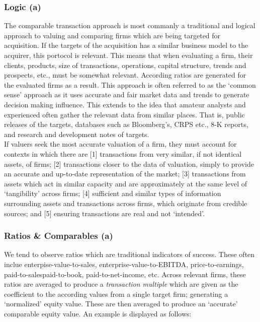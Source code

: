 \documentclass[11pt, english]{article}
\begin{document}
		\subsubsection*{Logic (a)}

	The comparable transaction approach is most commanly a traditional and logical approach to valuing and comparing firms which are being targeted for acquisition. If the targets of the acquisition has a similar business model to the acquirer, this portocol is relevant. This means that when evaluating a firm, their clients, products, size of transactions, operations, capital structure, trends and prospects, etc., must be somewhat relevant. According ratios are generated for the evaluated firms as a result. This approach is often referred to as the `common sense' approach as it uses accurate and fair market data and trends to generate decision making influence. This extends to the idea that amateur analysts and experienced often gather the relevant data from similar places. That is, public releases of the targets, databases such as Bloomberg's, CRPS etc., 8-K reports, and research and development notes of targets.\\

	If valuers seek the most accurate valuation of a firm, they must account for contexts in which there are [1] transactions from very similar, if not identical assets, of firms; [2] transactions closer to the data of valuation, simply to provide an accurate and up-to-date representation of the market; [3] transactions from assets which act in similar capacity and are approximately at the same level of `tangibility' across firms; [4] sufficient and similar types of information surrounding assets and transactions across firms, which originate from credible sources; and [5] ensuring transactions are real and not `intended'.

		\subsubsection*{Ratios \& Comparables (a)}
	
	We tend to observe ratios which are traditional indicators of success. These often inclue enterpise-value-to-sales, enterprise-value-to-EBITDA, price-to-earnings, paid-to-salespaid-to-book, paid-to-net-income, etc. Across relevant firms, these ratios are averaged to produce a \textit{transaction multiple} which are given as the coefficient to the according values from a single target firm; generating a `normalized' equity value. These are then averaged to produce an `accurate' comparable equity value. An example is displayed as follows:
	
\end{document}
